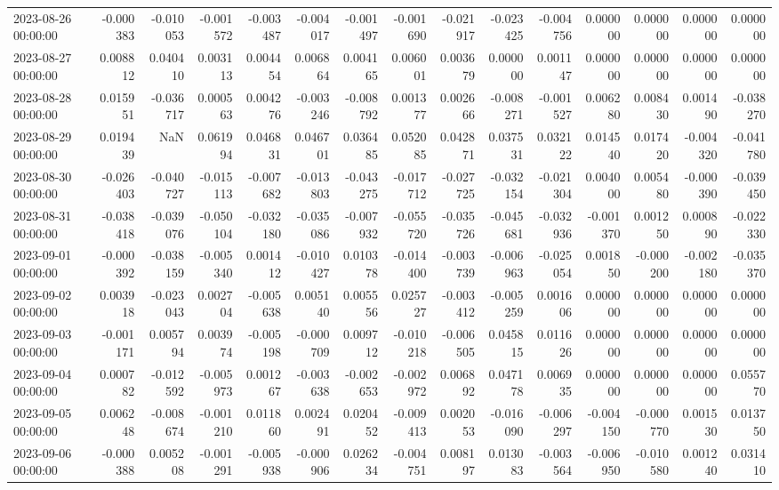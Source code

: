 \begin{tabular}{lrrrrrrrrrrrrrr}
2023-08-26 00:00:00 & -0.000383 & -0.010053 & -0.001572 & -0.003487 & -0.004017 & -0.001497 & -0.001690 & -0.021917 & -0.023425 & -0.004756 & 0.000000 & 0.000000 & 0.000000 & 0.000000 \\
2023-08-27 00:00:00 & 0.008812 & 0.040410 & 0.003113 & 0.004454 & 0.006864 & 0.004165 & 0.006001 & 0.003679 & 0.000000 & 0.001147 & 0.000000 & 0.000000 & 0.000000 & 0.000000 \\
2023-08-28 00:00:00 & 0.015951 & -0.036717 & 0.000563 & 0.004276 & -0.003246 & -0.008792 & 0.001377 & 0.002666 & -0.008271 & -0.001527 & 0.006280 & 0.008430 & 0.001490 & -0.038270 \\
2023-08-29 00:00:00 & 0.019439 & NaN & 0.061994 & 0.046831 & 0.046701 & 0.036485 & 0.052085 & 0.042871 & 0.037531 & 0.032122 & 0.014540 & 0.017420 & -0.004320 & -0.041780 \\
2023-08-30 00:00:00 & -0.026403 & -0.040727 & -0.015113 & -0.007682 & -0.013803 & -0.043275 & -0.017712 & -0.027725 & -0.032154 & -0.021304 & 0.004000 & 0.005480 & -0.000390 & -0.039450 \\
2023-08-31 00:00:00 & -0.038418 & -0.039076 & -0.050104 & -0.032180 & -0.035086 & -0.007932 & -0.055720 & -0.035726 & -0.045681 & -0.032936 & -0.001370 & 0.001250 & 0.000890 & -0.022330 \\
2023-09-01 00:00:00 & -0.000392 & -0.038159 & -0.005340 & 0.001412 & -0.010427 & 0.010378 & -0.014400 & -0.003739 & -0.006963 & -0.025054 & 0.001850 & -0.000200 & -0.002180 & -0.035370 \\
2023-09-02 00:00:00 & 0.003918 & -0.023043 & 0.002704 & -0.005638 & 0.005140 & 0.005556 & 0.025727 & -0.003412 & -0.005259 & 0.001606 & 0.000000 & 0.000000 & 0.000000 & 0.000000 \\
2023-09-03 00:00:00 & -0.001171 & 0.005794 & 0.003974 & -0.005198 & -0.000709 & 0.009712 & -0.010218 & -0.006505 & 0.045815 & 0.011626 & 0.000000 & 0.000000 & 0.000000 & 0.000000 \\
2023-09-04 00:00:00 & 0.000782 & -0.012592 & -0.005973 & 0.001267 & -0.003638 & -0.002653 & -0.002972 & 0.006892 & 0.047178 & 0.006935 & 0.000000 & 0.000000 & 0.000000 & 0.055770 \\
2023-09-05 00:00:00 & 0.006248 & -0.008674 & -0.001210 & 0.011860 & 0.002491 & 0.020452 & -0.009413 & 0.002053 & -0.016090 & -0.006297 & -0.004150 & -0.000770 & 0.001530 & 0.013750 \\
2023-09-06 00:00:00 & -0.000388 & 0.005208 & -0.001291 & -0.005938 & -0.000906 & 0.026234 & -0.004751 & 0.008197 & 0.013083 & -0.003564 & -0.006950 & -0.010580 & 0.001240 & 0.031410 \\

\end{tabular}
